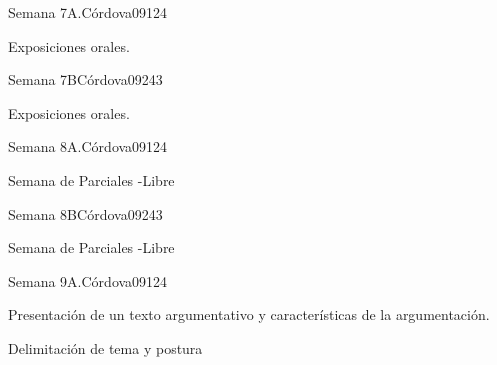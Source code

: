 \begin{syllabus}
\begin{unit}{Semana 7A.}{Córdova09}{12}{4}
   \begin{topics}
      \item Exposiciones orales.
   \end{topics}
   \begin{learningoutcomes}
      \item 
   \end{learningoutcomes}
\end{unit}

\begin{unit}{Semana 7B}{Córdova09}{24}{3}
   \begin{topics}
      \item Exposiciones orales.
   \end{topics}

   \begin{learningoutcomes}
      \item 
      \item
      \item 
      \end{learningoutcomes}
\end{unit}


\begin{unit}{Semana 8A.}{Córdova09}{12}{4}
   \begin{topics}
      \item Semana de Parciales -Libre
   \end{topics}
   \begin{learningoutcomes}
      \item 
   \end{learningoutcomes}
\end{unit}

\begin{unit}{Semana 8B}{Córdova09}{24}{3}
   \begin{topics}
      \item Semana de Parciales -Libre
   \end{topics}

   \begin{learningoutcomes}
      \item 
      \item
      \item 
      \end{learningoutcomes}
\end{unit}


\begin{unit}{Semana 9A.}{Córdova09}{12}{4}
   \begin{topics}
      \item Presentación de un texto argumentativo y características de la argumentación.
      \item Delimitación de tema y postura


\end{topics}
\end{unit}
\end{syllabus}

